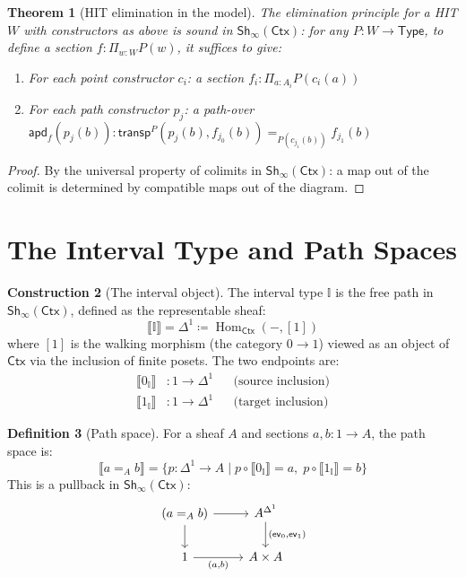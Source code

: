 \documentclass[11pt,a4paper]{report}
\theoremstyle{definition}
\newtheorem{definition}{Definition}[chapter]
\newtheorem{construction}[definition]{Construction}
\theoremstyle{plain}
\newtheorem{theorem}[definition]{Theorem}
\newcommand{\den}[1]{\llbracket #1 \rrbracket}
\newcommand{\Type}{\mathsf{Type}}
\newcommand{\interval}{\mathbb{I}}
\newcommand{\transp}{\mathsf{transp}}
\DeclareMathOperator{\Hom}{Hom}
\newcommand{\defeq}{\coloneqq}
\newcommand{\Ctx}{\mathsf{Ctx}}
\newcommand{\Sh}{\mathsf{Sh}}
\begin{document}
\begin{theorem}[HIT elimination in the model]
The elimination principle for a HIT $W$ with constructors as above is sound
in $\Sh_\infty(\Ctx)$: for any $P : W \to \Type$, to define a section
$f : \Pi_{w:W} P(w)$, it suffices to give:
\begin{enumerate}
  \item For each point constructor $c_i$: a section $f_i : \Pi_{a:A_i} P(c_i(a))$
  \item For each path constructor $p_j$: a path-over
    $\mathsf{apd}_{f}(p_j(b)) : \transp^P(p_j(b), f_{j_0}(b)) =_{P(c_{j_1}(b))} f_{j_1}(b)$
\end{enumerate}
\end{theorem}
\begin{proof}
By the universal property of colimits in $\Sh_\infty(\Ctx)$: a map out of the
colimit is determined by compatible maps out of the diagram.
\end{proof}


\section{The Interval Type and Path Spaces}

\begin{construction}[The interval object]
\label{constr:interval}
The interval type $\interval$ is the free path in $\Sh_\infty(\Ctx)$, defined
as the representable sheaf:
\[
  \den{\interval} = \Delta^1 \defeq \Hom_{\Ctx}(-, [1])
\]
where $[1]$ is the walking morphism (the category $0 \to 1$) viewed as an
object of $\Ctx$ via the inclusion of finite posets.  The two endpoints are:
\begin{align}
  \den{0_\interval} &: 1 \to \Delta^1 && \text{(source inclusion)} \\
  \den{1_\interval} &: 1 \to \Delta^1 && \text{(target inclusion)}
\end{align}
\end{construction}

\begin{definition}[Path space]
For a sheaf $A$ and sections $a, b : 1 \to A$, the path space is:
\[
  \den{a =_A b} = \{p : \Delta^1 \to A \mid p \circ \den{0_\interval} = a,\;
    p \circ \den{1_\interval} = b\}
\]
This is a pullback in $\Sh_\infty(\Ctx)$:
\[
\begin{tikzcd}
  (a =_A b) \ar[r] \ar[d] & A^{\Delta^1} \ar[d, "{(\mathsf{ev}_0, \mathsf{ev}_1)}"] \\
  1 \ar[r, "{(a, b)}"'] & A \times A
\end{tikzcd}
\]
\end{definition}
\end{document}
